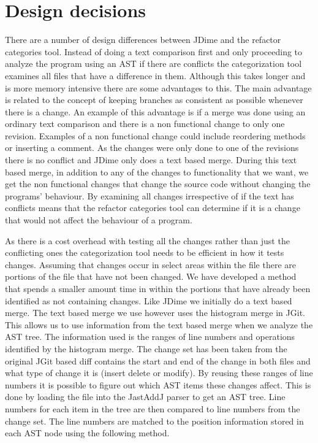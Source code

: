 \section{Design decisions}
There are a number of design differences between JDime and the refactor categories tool.  Instead of doing a text comparison first and only proceeding to analyze the program using an AST if there are conflicts the categorization tool examines all files that have a difference in them.  Although this takes longer and is more memory intensive there are some advantages to this. The main advantage is related to the concept of keeping branches as consistent as possible whenever there is a change. An example of this advantage is if a merge was done using an ordinary text comparison and there is a non functional change to only one revision. Examples of a non functional change could include reordering methods or inserting a comment.  As the changes were only done to one of the revisions there is no conflict and JDime only does a text based merge.  During this text based merge, in addition to any of the changes to functionality that we want, we get the non functional changes that change the source code without changing the programs' behaviour. By examining all changes irrespective of if the text has conflicts means that the refactor categories tool can determine if it is a change that would not affect the behaviour of a program.

As there is a cost overhead with testing all the changes rather than just the conflicting ones the categorization tool needs to be efficient in how it tests changes.  Assuming that changes occur in select areas within the file there are portions of the file that have not been changed.  We have developed a method that spends a smaller amount time in  within the portions that have already been identified as not containing changes.  Like JDime we initially do a text based merge.  The text based merge we use however uses the histogram merge in JGit.  This allows us to use information from the text based merge when we analyze the AST tree.  The information used is the ranges of line numbers and operations identified by the histogram merge. The change set has been taken from the original JGit based diff contains the start and end of the change in both files and what type of change it is (insert delete or modify).  By reusing these ranges of line numbers it is possible to figure out which AST items these changes affect. This is done by loading the file into the JastAddJ parser to get an AST tree. Line numbers for each item in the tree are then compared to line numbers from the change set. The line numbers are matched to the position information stored in each AST node using the following method.

